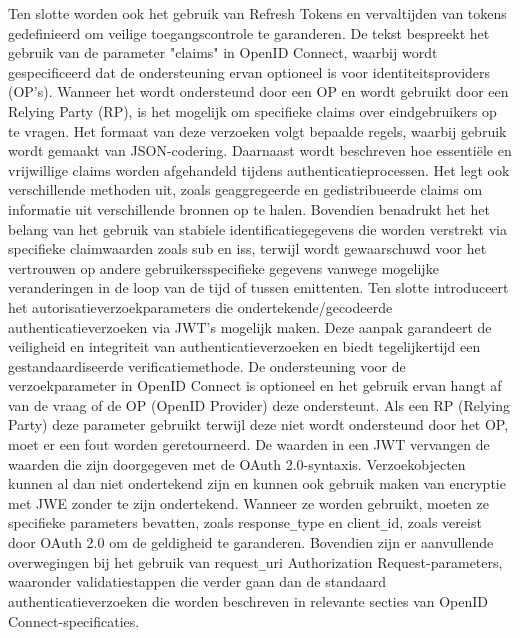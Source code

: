 Ten slotte worden ook het gebruik van Refresh Tokens en vervaltijden van tokens gedefinieerd om veilige toegangscontrole te garanderen.
\newline
De tekst bespreekt het gebruik van de parameter "claims" in OpenID Connect, waarbij wordt gespecificeerd dat de ondersteuning ervan optioneel is voor identiteitsproviders (OP's). Wanneer het wordt ondersteund door een OP en wordt gebruikt door een Relying Party (RP), is het mogelijk om specifieke claims over eindgebruikers op te vragen. Het formaat van deze verzoeken volgt bepaalde regels, waarbij gebruik wordt gemaakt van JSON-codering.
\newline
Daarnaast wordt beschreven hoe essentiële en vrijwillige claims worden afgehandeld tijdens authenticatieprocessen. Het legt ook verschillende methoden uit, zoals geaggregeerde en gedistribueerde claims om informatie uit verschillende bronnen op te halen.
\newline
Bovendien benadrukt het het belang van het gebruik van stabiele identificatiegegevens die worden verstrekt via specifieke claimwaarden zoals sub en iss, terwijl wordt gewaarschuwd voor het vertrouwen op andere gebruikersspecifieke gegevens vanwege mogelijke veranderingen in de loop van de tijd of tussen emittenten.
\newline
Ten slotte introduceert het autorisatieverzoekparameters die ondertekende/gecodeerde authenticatieverzoeken via JWT's mogelijk maken.
  Deze aanpak garandeert de veiligheid en integriteit van authenticatieverzoeken en biedt tegelijkertijd een gestandaardiseerde verificatiemethode.
  \newline
De ondersteuning voor de verzoekparameter in OpenID Connect is optioneel en het gebruik ervan hangt af van de vraag of de OP (OpenID Provider) deze ondersteunt. Als een RP (Relying Party) deze parameter gebruikt terwijl deze niet wordt ondersteund door het OP, moet er een fout worden geretourneerd. De waarden in een JWT vervangen de waarden die zijn doorgegeven met de OAuth 2.0-syntaxis.
\newline
Verzoekobjecten kunnen al dan niet ondertekend zijn en kunnen ook gebruik maken van encryptie met JWE zonder te zijn ondertekend. Wanneer ze worden gebruikt, moeten ze specifieke parameters bevatten, zoals response\verb|_|type en client\verb|_|id, zoals vereist door OAuth 2.0 om de geldigheid te garanderen.
\newline
Bovendien zijn er aanvullende overwegingen bij het gebruik van request\verb|_|uri Authorization Request-parameters, waaronder validatiestappen die verder gaan dan de standaard authenticatieverzoeken die worden beschreven in relevante secties van OpenID Connect-specificaties.
